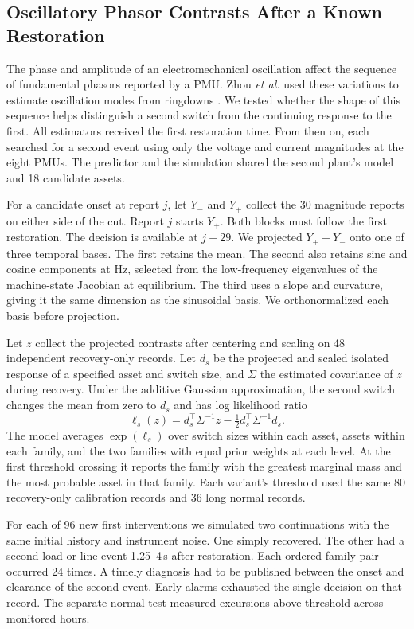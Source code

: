 \subsection{Oscillatory Phasor Contrasts After a Known Restoration}
\label{app:modal-recovery}

The phase and amplitude of an electromechanical oscillation affect the
sequence of fundamental phasors reported by a PMU. Zhou \emph{et al.}
used these variations to estimate oscillation modes from ringdowns
\cite{zhou2010phasorprony}. We tested whether
the shape of this sequence helps distinguish a second switch from the
continuing response to the first. All estimators received the first
restoration time. From then on, each searched for a second event using
only the voltage and current magnitudes at the eight PMUs. The predictor
and the simulation shared the second plant's model and 18 candidate
assets.

For a candidate onset at report $j$, let $Y_-$ and $Y_+$ collect the
30 magnitude reports on either side of the cut. Report $j$ starts
$Y_+$. Both blocks must follow the first restoration. The decision is
available at $j+29$. We projected $Y_+-Y_-$ onto one of three temporal
bases. The first retains the mean. The second also retains sine and
cosine components at \ModalFrequency{} Hz, selected from the low-frequency
eigenvalues of the machine-state Jacobian at equilibrium. The third
uses a slope and curvature, giving it the same dimension as the
sinusoidal basis. We orthonormalized each basis before projection.

Let $z$ collect the projected contrasts after centering and scaling on
48 independent recovery-only records. Let $d_s$ be the projected and
scaled isolated response of a specified asset and switch size, and
$\Sigma$ the estimated covariance of $z$ during recovery. Under the
additive Gaussian approximation, the second switch changes the mean
from zero to $d_s$ and has log likelihood ratio
\[
  \ell_s(z)=d_s^\top\Sigma^{-1}z-
                 \tfrac12 d_s^\top\Sigma^{-1}d_s .
\]
The model averages $\exp(\ell_s)$ over switch sizes within each asset,
assets within each family, and the two families with equal prior weights
at each level. At the first threshold crossing it reports the family
with the greatest marginal mass and the most probable asset in that
family. Each variant's threshold used the same 80 recovery-only
calibration records and 36 long normal records.

For each of 96 new first interventions we simulated two continuations
with the same initial history and instrument noise. One simply
recovered. The other had a second load or line event 1.25--4\,s after
restoration. Each ordered family pair occurred 24 times. A timely
diagnosis had to be published between the onset and clearance of the
second event. Early alarms exhausted the single decision on that record.
The separate normal test measured excursions above threshold across
\ModalQuietHours{} monitored hours.

